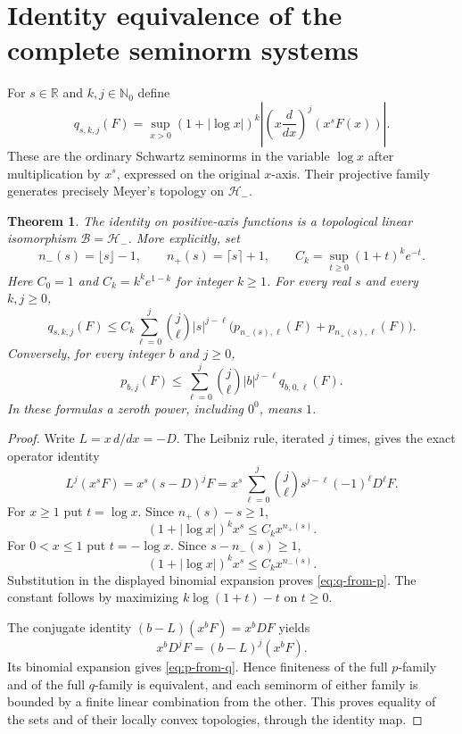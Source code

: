 \documentclass[11pt]{article}
\newtheorem{theorem}{Theorem}
\newcommand{\B}{\mathscr B}
\newcommand{\HH}{\mathcal H}
\newcommand{\R}{\mathbb R}
\newcommand{\N}{\mathbb N}
\begin{document}
\section{Identity equivalence of the complete seminorm systems}

For $s\in\R$ and $k,j\in\N_0$ define
\begin{equation}\label{eq:q}
 q_{s,k,j}(F)=\sup_{x>0}(1+|\log x|)^k
 \left|\left(x\frac d{dx}\right)^j(x^sF(x))\right|.
\end{equation}
These are the ordinary Schwartz seminorms in the variable $\log x$
after multiplication by $x^s$, expressed on the original $x$-axis. Their
projective family generates precisely Meyer's topology on $\HH_-$.

\begin{theorem}\label{thm:topology}
The identity on positive-axis functions is a topological linear
isomorphism $\B=\HH_-$. More explicitly, set
\[
 n_-(s)=\lfloor s\rfloor-1,\qquad n_+(s)=\lceil s\rceil+1,
 \qquad C_k=\sup_{t\geq0}(1+t)^ke^{-t}.
\]
Here $C_0=1$ and $C_k=k^ke^{1-k}$ for integer $k\geq1$.
For every real $s$ and every $k,j\geq0$,
\begin{equation}\label{eq:q-from-p}
 q_{s,k,j}(F)\leq C_k\sum_{\ell=0}^j\binom j\ell
 |s|^{j-\ell}\bigl(p_{n_-(s),\ell}(F)+p_{n_+(s),\ell}(F)\bigr).
\end{equation}
Conversely, for every integer $b$ and $j\geq0$,
\begin{equation}\label{eq:p-from-q}
 p_{b,j}(F)\leq\sum_{\ell=0}^j\binom j\ell
 |b|^{j-\ell}q_{b,0,\ell}(F).
\end{equation}
In these formulas a zeroth power, including $0^0$, means $1$.
\end{theorem}

\begin{proof}
Write $L=x\,d/dx=-D$. The Leibniz rule, iterated $j$ times, gives the
exact operator identity
\[
 L^j(x^sF)=x^s(s-D)^jF
   =x^s\sum_{\ell=0}^j\binom j\ell s^{j-\ell}(-1)^\ell D^\ell F.
\]
For $x\geq1$ put $t=\log x$. Since $n_+(s)-s\geq1$,
\[
 (1+|\log x|)^kx^s\leq C_kx^{n_+(s)}.
\]
For $0<x\leq1$ put $t=-\log x$. Since $s-n_-(s)\geq1$,
\[
 (1+|\log x|)^kx^s\leq C_kx^{n_-(s)}.
\]
Substitution in the displayed binomial expansion proves
\eqref{eq:q-from-p}. The constant follows by maximizing
$k\log(1+t)-t$ on $t\geq0$.

The conjugate identity $(b-L)(x^bF)=x^bDF$ yields
\[
 x^bD^jF=(b-L)^j(x^bF).
\]
Its binomial expansion gives \eqref{eq:p-from-q}. Hence finiteness of
the full $p$-family and of the full $q$-family is equivalent, and each
seminorm of either family is bounded by a finite linear combination
from the other. This proves equality of the sets and of their locally
convex topologies, through the identity map.
\end{proof}
\end{document}
